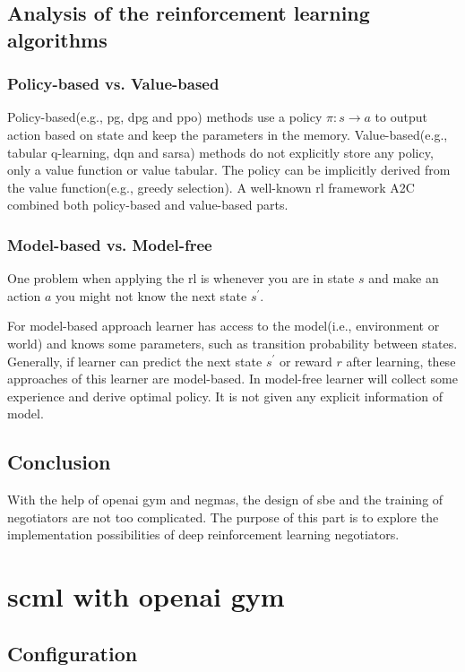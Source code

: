 \subsection{Analysis of the reinforcement learning algorithms}
\subsubsection{Policy-based vs. Value-based}
Policy-based(e.g., \gls{pg}, \gls{dpg} and \gls{ppo}) methods use a policy $\pi:s \to a$ to output action based on state and keep the parameters in the memory. Value-based(e.g., tabular q-learning, \gls{dqn} and \gls{sarsa}) methods do not explicitly store any policy, only a value function or value tabular. The policy can be implicitly derived from the value function(e.g., greedy selection). A well-known \gls{rl} framework A2C combined both policy-based and value-based parts.

\subsubsection{Model-based vs. Model-free}
One problem when applying the \gls{rl} is whenever you are in state $s$ and make an action $a$ you might not know the next state $s^{\prime}$.

For model-based approach learner has access to the model(i.e., environment or world) and knows some parameters, such as transition probability between states. Generally, if learner can predict the next state $s^{\prime}$ or reward $r$ after learning, these approaches of this learner are model-based. In model-free learner will collect some experience and derive optimal policy. It is not given any explicit information of model.

\subsection{Conclusion}
With the help of \gls{openai gym} and \gls{negmas}, the design of \gls{sbe} and the training of negotiators are not too complicated. The purpose of this part is to explore the implementation possibilities of deep reinforcement learning negotiators.

\section{\gls{scml} with \gls{openai gym}}
\subsection{Configuration}
